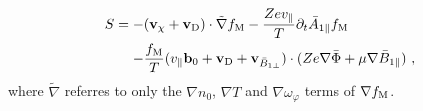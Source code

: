 \begin{gather}
	\begin{aligned}
		S = -& (\boldsymbol{\mathbf{v}}_\chi + \boldsymbol{\mathbf{v}}_\mathrm{D}) \cdot \tilde{\nabla} f_\mathrm{M} - \frac{Z e v_\parallel}{T} \partial_t \bar{A}_{1\parallel} f_\mathrm{M} \\
		    -& \frac{f_\mathrm{M}}{T} (v_\parallel \boldsymbol{\mathbf{b}}_0 + \boldsymbol{\mathbf{v}}_\mathrm{D} + \boldsymbol{\mathbf{v}}_{\bar{B}_{1\perp}}) \cdot (Z e \nabla \bar{\Phi} + \mu \nabla \bar{B}_{1\parallel})~,
	\end{aligned}
	\label{eq:sourceTerm}
\end{gather}
where $\tilde{\nabla}$ referres to only the $\nabla n_0$, $\nabla T$ and $\nabla \omega_\varphi$ terms of $\nabla f_\mathrm{M}$.